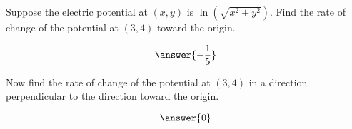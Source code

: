 \documentclass{ximera}
\author{David Guichard \and Neal Koblitz \and H. Jerome Keisler \and Albert Scheller \and Barry Balof \and Mike Wills \and Matthew Carr}
\begin{document}
\begin{exercise}




Suppose the electric potential at $(x,y)$ is $\ln(\sqrt{x^2+y^2})$. Find the rate of change of the potential at $(3,4)$ toward the origin.

\begin{prompt}
\[
\answer{-\frac{1}{5}}
\]
\end{prompt}

Now find the rate of change of the potential at $(3,4)$ in a direction perpendicular to the direction toward the origin.

\begin{prompt}
\[
\answer{0}
\]
\end{prompt}

\end{exercise}
\end{document}
